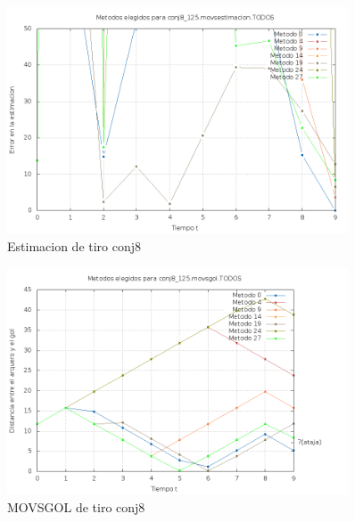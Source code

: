\begin{figure}[H]
\begin{center}
\includegraphics[width=0.9\textwidth]{img/conj8_125_movsestimacion_TODOS_elegidos.png}
     \caption{Estimacion de tiro conj8}
\end{center}
\end{figure}

\begin{figure}[H]
\begin{center}
\includegraphics[width=0.9\textwidth]{img/conj8_125_movsgol_TODOS_elegidos.png}
     \caption{MOVSGOL de tiro conj8}
\end{center}
\end{figure}

